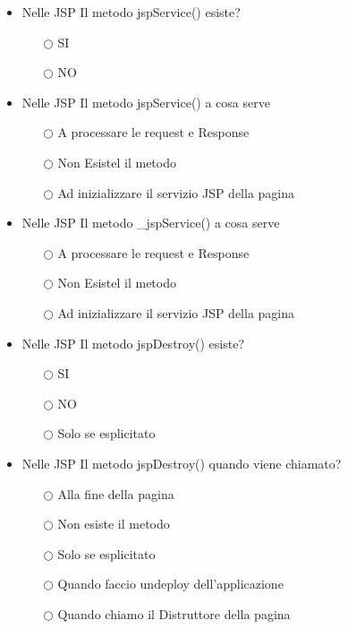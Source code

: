 \documentclass[10pt,twocolumn]{article}
\begin{document}
\begin{itemize}
    \item Nelle JSP Il metodo jspService() esiste?
          \begin{itemize}
              \item[$\bigcirc$] SI
              \item[$\bigcirc$] NO
          \end{itemize}
\end{itemize}
\begin{itemize}
    \item Nelle JSP Il metodo jspService() a cosa serve
          \begin{itemize}
              \item[$\bigcirc$] A processare le request e Response
              \item[$\bigcirc$] Non Esistel il metodo
              \item[$\bigcirc$] Ad inizializzare il servizio JSP della pagina
          \end{itemize}
\end{itemize}
\begin{itemize}
    \item Nelle JSP Il metodo \_jspService() a cosa serve
          \begin{itemize}
              \item[$\bigcirc$] A processare le request e Response
              \item[$\bigcirc$] Non Esistel il metodo
              \item[$\bigcirc$] Ad inizializzare il servizio JSP della pagina
          \end{itemize}
\end{itemize}
\begin{itemize}
    \item Nelle JSP Il metodo jspDestroy() esiste?
          \begin{itemize}
              \item[$\bigcirc$] SI
              \item[$\bigcirc$] NO
              \item[$\bigcirc$] Solo se esplicitato
          \end{itemize}
\end{itemize}
\begin{itemize}
    \item Nelle JSP Il metodo jspDestroy() quando viene chiamato?
          \begin{itemize}
              \item[$\bigcirc$] Alla fine della pagina
              \item[$\bigcirc$] Non esiste il metodo
              \item[$\bigcirc$] Solo se esplicitato
              \item[$\bigcirc$] Quando faccio undeploy dell'applicazione
              \item[$\bigcirc$] Quando chiamo il Distruttore della pagina
          \end{itemize}
\end{itemize}
\end{document}
